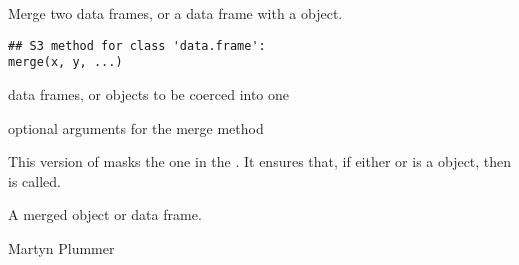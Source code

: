 \begin{Description}\relax
Merge two data frames, or a data frame with a  object.
\end{Description}
\begin{Usage}
\begin{verbatim}
## S3 method for class 'data.frame':
merge(x, y, ...)
\end{verbatim}
\end{Usage}
\begin{Arguments}
\begin{ldescription}
\item[\code{x, y}] data frames, or objects to be coerced into one
\item[\code{...}] optional arguments for the merge method
\end{ldescription}
\end{Arguments}
\begin{Details}\relax
This version of  masks the one in the .
It ensures that, if either  or  is a 
object, then  is called.
\end{Details}
\begin{Value}
A merged  object or data frame.
\end{Value}
\begin{Author}\relax
Martyn Plummer
\end{Author}
\begin{SeeAlso}\relax
{}
\end{SeeAlso}

